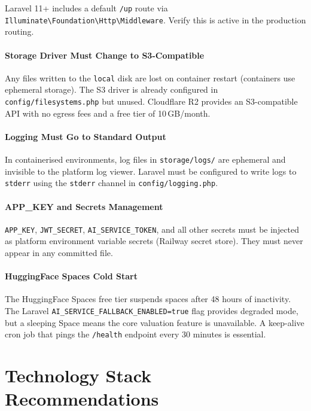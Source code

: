\documentclass[12pt,a4paper]{report}
\begin{document}
Laravel 11+ includes a default \texttt{/up} route via
\texttt{Illuminate\textbackslash Foundation\textbackslash Http\textbackslash Middleware}.
Verify this is active in the production routing.

\subsubsection{Storage Driver Must Change to S3-Compatible}

Any files written to the \texttt{local} disk are lost on container
restart (containers use ephemeral storage). The S3 driver is already
configured in \texttt{config/filesystems.php} but unused. Cloudflare R2
provides an S3-compatible API with no egress fees and a free tier of
10\,GB/month.

\subsubsection{Logging Must Go to Standard Output}

In containerised environments, log files in \texttt{storage/logs/} are
ephemeral and invisible to the platform log viewer. Laravel must be
configured to write logs to \texttt{stderr} using the \texttt{stderr}
channel in \texttt{config/logging.php}.

\subsubsection{APP\_KEY and Secrets Management}

\texttt{APP\_KEY}, \texttt{JWT\_SECRET}, \texttt{AI\_SERVICE\_TOKEN},
and all other secrets must be injected as platform environment variable
secrets (Railway secret store). They must never appear in any committed
file.

\subsubsection{HuggingFace Spaces Cold Start}

The HuggingFace Spaces free tier suspends spaces after 48 hours of
inactivity. The Laravel \texttt{AI\_SERVICE\_FALLBACK\_ENABLED=true}
flag provides degraded mode, but a sleeping Space means the core
valuation feature is unavailable. A keep-alive cron job that pings
the \texttt{/health} endpoint every 30 minutes is essential.

\chapter{Technology Stack Recommendations}
\label{ch:techstack}
\end{document}
